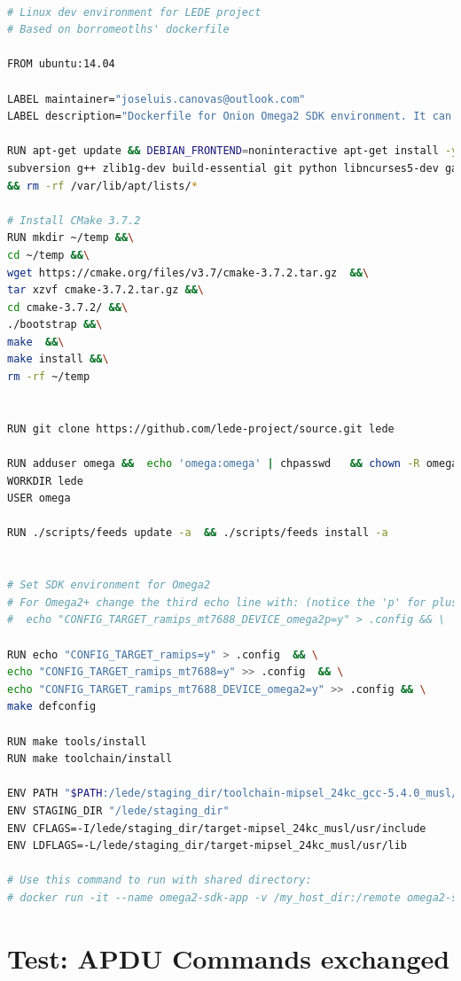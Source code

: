 \hfil

\begin{lstlisting}[language=bash,frame=tb,caption={Dockerfile for Omega2 SDK},label=lst:dockerLEDE]

# Linux dev environment for LEDE project
# Based on borromeotlhs' dockerfile

FROM ubuntu:14.04

LABEL maintainer="joseluis.canovas@outlook.com"
LABEL description="Dockerfile for Onion Omega2 SDK environment. It can be modified for Omega2+."

RUN apt-get update && DEBIAN_FRONTEND=noninteractive apt-get install -y \
subversion g++ zlib1g-dev build-essential git python libncurses5-dev gawk gettext unzip file libssl-dev wget \
&& rm -rf /var/lib/apt/lists/*

# Install CMake 3.7.2
RUN mkdir ~/temp &&\
cd ~/temp &&\
wget https://cmake.org/files/v3.7/cmake-3.7.2.tar.gz  &&\
tar xzvf cmake-3.7.2.tar.gz &&\
cd cmake-3.7.2/ &&\
./bootstrap &&\
make  &&\
make install &&\
rm -rf ~/temp


RUN git clone https://github.com/lede-project/source.git lede

RUN adduser omega &&  echo 'omega:omega' | chpasswd   && chown -R omega:omega lede
WORKDIR lede
USER omega

RUN ./scripts/feeds update -a  && ./scripts/feeds install -a 


# Set SDK environment for Omega2
# For Omega2+ change the third echo line with: (notice the 'p' for plus)
#  echo "CONFIG_TARGET_ramips_mt7688_DEVICE_omega2p=y" > .config && \

RUN echo "CONFIG_TARGET_ramips=y" > .config  && \
echo "CONFIG_TARGET_ramips_mt7688=y" >> .config  && \
echo "CONFIG_TARGET_ramips_mt7688_DEVICE_omega2=y" >> .config && \
make defconfig

RUN make tools/install
RUN make toolchain/install

ENV PATH "$PATH:/lede/staging_dir/toolchain-mipsel_24kc_gcc-5.4.0_musl/bin"
ENV STAGING_DIR "/lede/staging_dir"
ENV CFLAGS=-I/lede/staging_dir/target-mipsel_24kc_musl/usr/include
ENV LDFLAGS=-L/lede/staging_dir/target-mipsel_24kc_musl/usr/lib

# Use this command to run with shared directory:
# docker run -it --name omega2-sdk-app -v /my_host_dir:/remote omega2-sdk bash

\end{lstlisting}

\chapter{Test: APDU Commands exchanged}\label{ch:resultsdiagrams}

